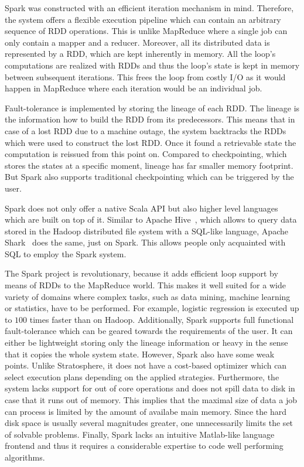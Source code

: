 Spark was constructed with an efficient iteration mechanism in mind.
Therefore, the system offers a flexible execution pipeline which can contain an arbitrary sequence of RDD operations.
This is unlike MapReduce where a single job can only contain a mapper and a reducer.
Moreover, all its distributed data is represented by a RDD, which are kept inherently in memory.
All the loop's computations are realized with RDDs and thus the loop's state is kept in memory between subsequent iterations.
This frees the loop from costly I/O as it would happen in MapReduce where each iteration would be an individual job.

Fault-tolerance is implemented by storing the lineage of each RDD.
The lineage is the information how to build the RDD from its predecessors.
This means that in case of a lost RDD due to a machine outage, the system backtracks the RDDs which were used to construct the lost RDD.
Once it found a retrievable state the computation is reissued from this point on.
Compared to checkpointing, which stores the states at a specific moment, lineage has far smaller memory footprint.
But Spark also supports traditional checkpointing which can be triggered by the user.

Spark does not only offer a native Scala API but also higher level languages which are built on top of it.
Similar to Apache Hive~\cite{hive}, which allows to query data stored in the Hadoop distributed file system with a SQL-like language, Apache Shark~\cite{xin:2013a} does the same, just on Spark.
This allows people only acquainted with SQL to employ the Spark system.

The Spark project is revolutionary, because it adds efficient loop support by means of RDDs to the MapReduce world.
This makes it well suited for a wide variety of domains where complex tasks, such as data mining, machine learning or statistics, have to be performed.
For example, logistic regression is executed up to $100$ times faster than on Hadoop.
Additionally, Spark supports full functional fault-tolerance which can be geared towards the requirements of the user.
It can either be lightweight storing only the lineage information or heavy in the sense that it copies the whole system state.
However, Spark also have some weak points.
Unlike Stratosphere, it does not have a cost-based optimizer which can select execution plans depending on the applied strategies.
Furthermore, the system lacks support for out of core operations and does not spill data to disk in case that it runs out of memory.
This implies that the maximal size of data a job can process is limited by the amount of availabe main memory.
Since the hard disk space is usually several magnitudes greater, one unnecessarily limits the set of solvable problems.
Finally, Spark lacks an intuitive Matlab-like language frontend and thus it requires a considerable expertise to code well performing algorithms.

